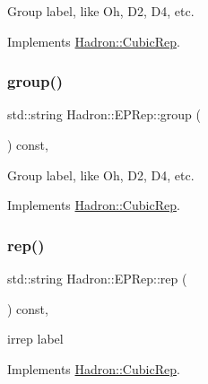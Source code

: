 Group label, like Oh, D2, D4, etc. 

Implements \mbox{\hyperlink{structHadron_1_1CubicRep_a0748f11ec87f387062c8e8981339a29c}{Hadron\+::\+Cubic\+Rep}}.

\mbox{\label{structHadron_1_1EPRep_a616ca775839a0a87e82fbef0de6f1cab}} 
\subsubsection{\texorpdfstring{group()}{group()}\hspace{0.1cm}{\footnotesize\ttfamily [2/2]}}
{\footnotesize\ttfamily std\+::string Hadron\+::\+E\+P\+Rep\+::group (\begin{DoxyParamCaption}{ }\end{DoxyParamCaption}) const\hspace{0.3cm}{\ttfamily [inline]}, {\ttfamily [virtual]}}

Group label, like Oh, D2, D4, etc. 

Implements \mbox{\hyperlink{structHadron_1_1CubicRep_a0748f11ec87f387062c8e8981339a29c}{Hadron\+::\+Cubic\+Rep}}.

\mbox{\label{structHadron_1_1EPRep_aa5bf2023752cfb939ced1f054cfd588f}} 
\subsubsection{\texorpdfstring{rep()}{rep()}\hspace{0.1cm}{\footnotesize\ttfamily [1/2]}}
{\footnotesize\ttfamily std\+::string Hadron\+::\+E\+P\+Rep\+::rep (\begin{DoxyParamCaption}{ }\end{DoxyParamCaption}) const\hspace{0.3cm}{\ttfamily [inline]}, {\ttfamily [virtual]}}

irrep label 

Implements \mbox{\hyperlink{structHadron_1_1CubicRep_ac3eb63608803d44c68681f158e14eb1b}{Hadron\+::\+Cubic\+Rep}}.

\mbox{\label{structHadron_1_1EPRep_aa5bf2023752cfb939ced1f054cfd588f}} 
